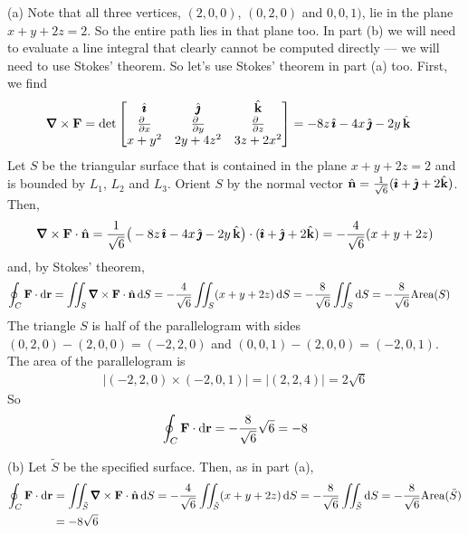 \begin{solution}
(a) Note that all three vertices, $(2,0,0)$, $(0,2,0)$ and $0,0,1)$, lie in the
plane $x+y+2z=2$. So the entire path lies in that plane too. 
In part (b)
we will need to evaluate a line integral that clearly cannot be computed
directly --- we will need to use Stokes' theorem. So let's use
Stokes' theorem in part (a) too. First, we find
\begin{align*}
\vnabla\times\vF
&=\det\left[\begin{matrix}
\hi &\hj &\hk \\
\tfrac{\partial\hfill}{\partial x} & \tfrac{\partial\hfill}{\partial y} & 
                \tfrac{\partial\hfill}{\partial z} \\
x+y^2 & 2y+4z^2 & 3z+2x^2
\end{matrix}
\right]
=-8z\,\hi - 4x\,\hj - 2y\,\hk
\end{align*}
Let $S$ be the triangular surface that is contained in the plane 
$x+y+2z=2$ and is bounded by $L_1$, $L_2$ and $L_3$. Orient $S$ by the normal vector $\hat{\mathbf{n}} = \frac{1}{\sqrt{6}}(\hat{\pmb{\imath}}+\hat{\pmb{\jmath}}+2\hat{\mathbf{k}})$. Then, 
\begin{equation*}
\vnabla\times\vF\cdot\hn
=\frac{1}{\sqrt{6}}\big(-8z\,\hi - 4x\,\hj - 2y\,\hk\big)\cdot(\hi+\hj+2\hk)
=-\frac{4}{\sqrt{6}}(x+y+2z)
\end{equation*}
and, by Stokes' theorem,
\begin{align*}
\oint_C\vF\cdot \dee{\vr}
&=\dblInt_S\vnabla\times\vF\cdot\hn\,\dee{S}
=-\frac{4}{\sqrt{6}}\dblInt_S(x+y+2z)\,\dee{S}
=-\frac{8}{\sqrt{6}}\dblInt_S\dee{S}
=-\frac{8}{\sqrt{6}}\text{Area}(S)
\end{align*}
The triangle $S$ is half of the parallelogram with sides $(0,2,0)-(2,0,0)
=(-2,2,0)$ and $(0,0,1)-(2,0,0)=(-2,0,1)$. The area of the parallelogram
is
\begin{align*}
\big|(-2,2,0)\times (-2,0,1)\big|
=\big|(2,2,4)\big|
=2\sqrt{6}
\end{align*}
So
\begin{align*}
\oint_C\mathbf{F}\cdot \mathrm{d}\mathbf{r} = -\frac{8}{\sqrt{6}} \sqrt{6}
=-8
\end{align*}

\noindent (b)
Let $\tilde S$ be the specified surface. Then, as in part (a), 
\begin{align*}
\oint_C\vF\cdot \dee{\vr}
&=\dblInt_{\tilde S}\vnabla\times\vF\cdot\hn\,\dee{S}
=-\frac{4}{\sqrt{6}}\dblInt_{\tilde S}(x+y+2z)\,\dee{S}
=-\frac{8}{\sqrt{6}}\dblInt_{\tilde S}\dee{S}
=-\frac{8}{\sqrt{6}}\text{Area}(\tilde S) \\
&=-8\sqrt{6}
\end{align*}
\end{solution}


